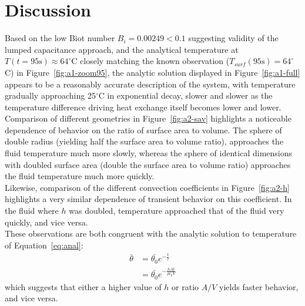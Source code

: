 \documentclass[12pt]{article}
\begin{document}
\FloatBarrier\section{Discussion}\label{sec:disc}
Based on the low Biot number $B_i=0.00249<0.1$ suggesting validity of the lumped capacitance approach, and the analytical temperature at $T(t=95\mathrm{s})\approx64^\circ$C closely matching the known observation ($T_{surf}(95\mathrm{s})=64^\circ$C) in Figure~\ref{fig:a1-zoom95}, the analytic solution displayed in Figure~\ref{fig:a1-full} appears to be a reasonably accurate description of the system, with temperature gradually approaching 25$^\circ$C in exponential decay, slower and slower as the temperature difference driving heat exchange itself becomes lower and lower.\\

Comparison of different geometries in Figure~\ref{fig:a2-sav} highlights a noticeable dependence of behavior on the ratio of surface area to volume.
The sphere of double radius (yielding half the surface area to volume ratio), approaches the fluid temperature much more slowly, whereas the sphere of identical dimensions with doubled surface area (double the surface area to volume ratio) approaches the fluid temperature much more quickly.\\

Likewise, comparison of the different convection coefficients in Figure~\ref{fig:a2-h} highlights a very similar dependence of transient behavior on this coefficient.
In the fluid where $h$ was doubled, temperature approached that of the fluid very quickly, and vice versa.\\

These observations are both congruent with the analytic solution to temperature of Equation~\ref{eq:anal}:
\begin{align*}
    \bar{\theta}&=\bar{\theta_0}e^{-\frac{t}{\tau}}\\
    &=\bar{\theta_0}e^{-\frac{hAt}{\rho c_p V}}
\end{align*}
which suggests that either a higher value of $h$ or ratio $A/V$ yields faster behavior, and vice versa.\\
\end{document}
